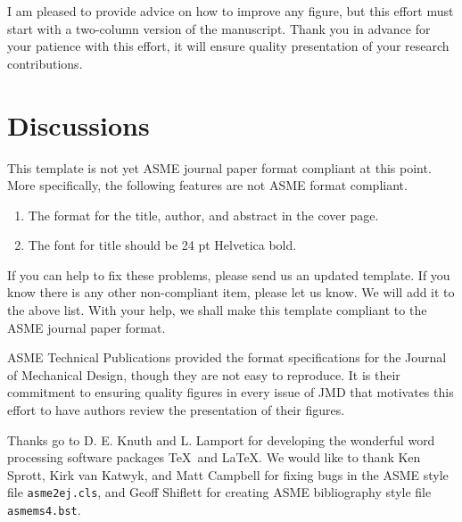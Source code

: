 \documentclass[twocolumn,10pt,journal]{asme2e}
\begin{document}
I am pleased to provide advice on how to improve any figure, but this effort must start with a two-column version of the manuscript.
Thank you in advance for your patience with this effort, it will ensure quality presentation of your research contributions.



\section{Discussions}
This template is not yet ASME journal paper format compliant at this point.
More specifically, the following features are not ASME format compliant.
\begin{enumerate}
\item
 The format for the title, author, and abstract in the cover page.
\item
 The font for title should be 24 pt Helvetica bold.
\end{enumerate}

\noindent
If you can help to fix these problems, please send us an updated template.
If you know there is any other non-compliant item, please let us know.
We will add it to the above list.
With your help, we shall make this template compliant to the ASME journal paper format.


\begin{acknowledgment}
 ASME Technical Publications provided the format specifications for the Journal of Mechanical Design, though they are not easy to reproduce.
 It is their commitment to ensuring quality figures in every issue of JMD that motivates this effort to have authors review the presentation of their figures.

 Thanks go to D. E. Knuth and L. Lamport for developing the wonderful word processing software packages \TeX\ and \LaTeX. We would like to thank Ken Sprott, Kirk van Katwyk, and Matt Campbell for fixing bugs in the ASME style file \verb+asme2ej.cls+, and Geoff Shiflett for creating ASME bibliography style file \verb+asmems4.bst+.
\end{acknowledgment}

%
\end{document}
